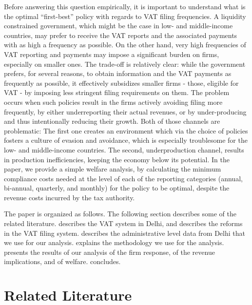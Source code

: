Before answering this question empirically, it is important to understand what is the optimal ``first-best'' policy with regards to VAT filing frequencies. A liquidity constrained government, which might be the case in  low- and middle-income countries, may prefer to receive the VAT reports and the associated payments with as high a frequency as possible. On the other hand, very high frequencies of VAT reporting and payments may  impose a significant burden on firms, especially on smaller ones. The trade-off is relatively clear: while the government prefers, for several reasons, to obtain information and the VAT payments as frequently as possible, it effectively subsidizes smaller firms - those, eligible for VAT - by imposing less stringent filing requirements on them. The problem occurs when such policies result in the firms actively avoiding filing more frequently, by either underreporting their actual revenues, or by under-producing and thus intentionally reducing their growth. Both of those channels are problematic: The first one creates an environment which via the choice of policies fosters a culture of evasion and avoidance, which is especially troublesome for the low- and middle-income countries. The second, underproduction channel, results in production inefficiencies, keeping the economy below its potential. In the paper, we provide a simple welfare analysis, by calculating the minimum compliance costs needed at the level of each of the reporting categories (annual, bi-annual, quarterly, and monthly) for the policy to be optimal, despite the revenue costs incurred by the tax authority. 


The paper is organized as follows. The following section describes some of the related literature.  describes the VAT system in Delhi, and describes the reforms in the VAT filing system.  describes the administrative level data from Delhi that we use for our analysis.  explains the methodology we use for the analysis.  presents the results of our analysis of the firm response, of the revenue implications, and of welfare.  concludes.

\section{Related Literature
\label{sec:related-literature}}

